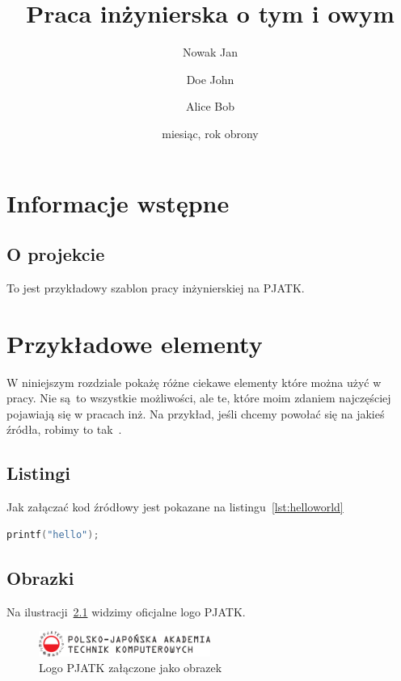 \documentclass{sprz}
\title{Praca inżynierska o tym i owym}
\author{Nowak Jan}{s1234}{Sztuczna Inteligencja}{Stacjonarny}
\author{Doe John}{s1222}{Aplikacje Internetowe}{Stacjonarny}
\author{Alice Bob}{s1299}{Bumelanctwo stosowane}{Stacjonarny}
\date{miesiąc, rok obrony}
\begin{document}
\maketitle

\makeprojectcard

\tableofcontents

\chapter{Informacje wstępne}



\section{O projekcie}\label{ch:wstep}

To jest przykładowy szablon pracy inżynierskiej na PJATK.

\chapter{Przykładowe elementy}

W niniejszym rozdziale pokażę różne ciekawe elementy które można użyć w pracy. Nie są to wszystkie możliwości, ale te, które moim zdaniem najczęściej pojawiają się w pracach inż. Na przykład, jeśli chcemy powołać się na jakieś źródła, robimy to tak~\cite{BEHESHTIROUI2021107419}.

\section{Listingi}

Jak załączać kod źródłowy jest pokazane na listingu~\ref{lst:helloworld}


\begin{lstlisting}[language=c,caption={Przykładowy witaj w świecie}, label={lst:helloworld}]
printf("hello");
\end{lstlisting}

\section{Obrazki}

Na ilustracji~\ref{img:pjatklogo} widzimy oficjalne logo PJATK.

\begin{figure}[h!]
    \centering
    \includegraphics[width=0.5\textwidth]{sprz/pjatk}
    \caption{Logo PJATK załączone jako obrazek}
    \label{img:pjatklogo}
\end{figure}
\end{document}
